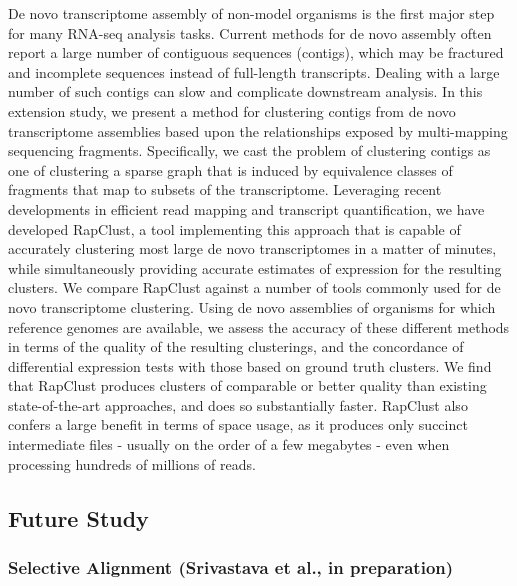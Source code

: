 De novo transcriptome assembly of non-model organisms is the first major step for many 
RNA-seq analysis tasks. Current methods for de novo assembly often report a large number 
of contiguous sequences (contigs), which may be fractured and incomplete sequences 
instead of full-length transcripts. Dealing with a large number of such contigs can 
slow and complicate downstream analysis. In this extension study, we present a method 
for clustering contigs from de novo transcriptome assemblies based upon the relationships 
exposed by multi-mapping sequencing fragments. Specifically, we cast the problem of 
clustering contigs as one of clustering a sparse graph that is induced by equivalence 
classes of fragments that map to subsets of the transcriptome. Leveraging recent developments 
in efficient read mapping and transcript quantification, we have developed RapClust, a tool 
implementing this approach that is capable of accurately clustering most large de novo 
transcriptomes in a matter of minutes, while simultaneously providing accurate estimates of 
expression for the resulting clusters. We compare RapClust against a number of tools commonly 
used for de novo transcriptome clustering. Using de novo assemblies of organisms for which 
reference genomes are available, we assess the accuracy of these different methods in terms of 
the quality of the resulting clusterings, and the concordance of differential expression tests 
with those based on ground truth clusters. We find that RapClust produces clusters of comparable 
or better quality than existing state-of-the-art approaches, and does so substantially faster. 
RapClust also confers a large benefit in terms of space usage, as it produces only succinct 
intermediate files - usually on the order of a few megabytes - even when processing hundreds 
of millions of reads.

\subsection{Future Study}
\subsubsection{Selective Alignment (Srivastava et al., in preparation)}

